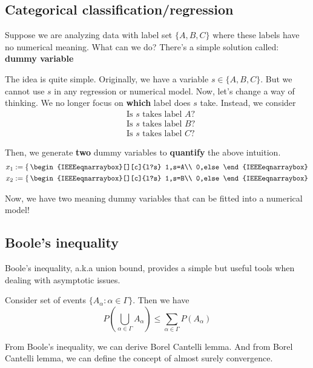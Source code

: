 \documentclass[Probability_Theory.tex]{subfiles}
\begin{document}
\subsection{Categorical classification/regression}
Suppose we are analyzing data with label set $\{A,B,C\}$ where these labels have no numerical meaning. What can we do? There's a simple solution called: {\bf dummy variable}

The idea is quite simple. Originally, we have a variable $s\in\{A,B,C\}$. But we cannot use $s$ in any regression or numerical model. Now, let's change a way of thinking. We no longer focus on {\bf which } label does $s$ take. Instead, we consider
\begin{align*}
&\mbox{Is $s$ takes label $A$?}\\
&\mbox{Is $s$ takes label $B$?}\\
&\mbox{Is $s$ takes label $C$?}
\end{align*}

Then, we generate {\bf two} dummy variables to {\bf quantify} the above intuition.
\begin{align*}
&x_1:=\left\{ \,
	\begin{IEEEeqnarraybox}[][c]{l?s}
	1,s=A\\
	0,else
	\end{IEEEeqnarraybox}
	\right.\\
&x_2:=\left\{ \,
\begin{IEEEeqnarraybox}[][c]{l?s}
1,s=B\\
0,else
\end{IEEEeqnarraybox}
\right.
\end{align*}

Now, we have two meaning dummy variables that can be fitted into a numerical model!

\subsection{Boole's inequality}
Boole's inequality, a.k.a union bound, provides a simple but useful tools when dealing with asymptotic issues.
\begin{theorem}
	Consider set of events $\{A_{\alpha}:\alpha\in\Gamma\}$. Then we have
	$$P(\bigcup_{\alpha\in\Gamma}A_{\alpha})\leq\sum_{\alpha\in\Gamma}P(A_{\alpha})$$
\end{theorem}

From Boole's inequality, we can derive Borel Cantelli lemma. And from Borel Cantelli lemma, we can define the concept of almost surely convergence.
\end{document}
